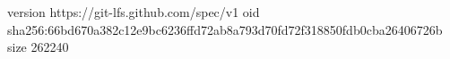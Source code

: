 version https://git-lfs.github.com/spec/v1
oid sha256:66bd670a382c12e9bc6236ffd72ab8a793d70fd72f318850fdb0cba26406726b
size 262240
